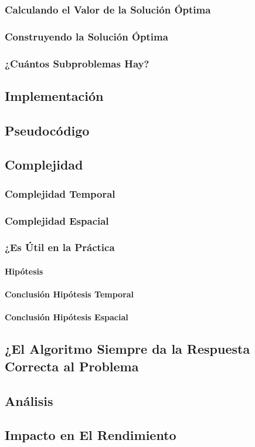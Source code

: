 \documentclass[11pt,letter]{article}
\begin{document}
\begin{itemize}
    \subsubsection{Calculando el Valor de la Solución Óptima}
    \subsubsection{Construyendo la Solución Óptima}
    \subsubsection{¿Cuántos Subproblemas Hay?}
    \subsection{Implementación}
    \subsection{Pseudocódigo}
    \subsection{Complejidad}
    \subsubsection{Complejidad Temporal}
    \subsubsection{Complejidad Espacial}
    \subsubsection{¿Es Útil en la Práctica}
    \paragraph{Hipótesis}
    \paragraph{Conclusión Hipótesis Temporal}
    \paragraph{Conclusión Hipótesis Espacial}
    \subsection{¿El Algoritmo Siempre da la Respuesta Correcta al Problema}
    \subsection{Análisis}
    \subsection{Impacto en El Rendimiento}
    
\end{itemize}
\end{document}
